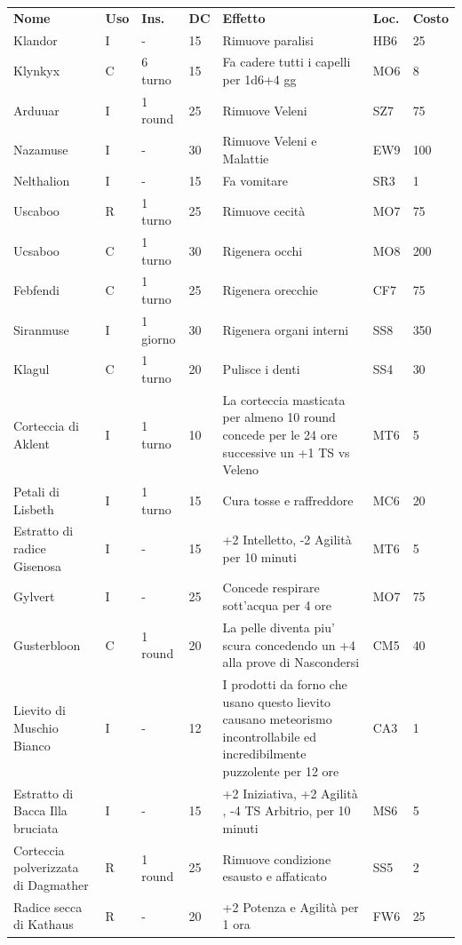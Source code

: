 \documentclass[a4paper,11pt,twoside,openany]{book}
\begin{document}
\begin{tabularx}{0.95\textwidth}{XlllXll}
\textbf{Nome}  & \textbf{Uso} & \textbf{Ins.} & \textbf{DC} & \textbf{Effetto}& \textbf{Loc.} & \textbf{Costo} \\
Klandor\index{Klandor}   & I  & -    & 15& Rimuove paralisi& HB6 & 25   \\
Klynkyx\index{Klynkyx}   & C  & 6 turno   & 15& Fa cadere tutti i capelli per 1d6+4 gg   & MO6 & 8    \\
Arduuar\index{Arduuar}   & I  & 1 round   & 25& Rimuove Veleni  & SZ7 & 75   \\
Nazamuse \index{Nazamuse}& I  & -    & 30& Rimuove Veleni e Malattie & EW9 & 100  \\
Nelthalion \index{Nelthalion} & I  & -    & 15& Fa vomitare& SR3 & 1    \\
Uscaboo \index{Uscaboo}  & R  & 1 turno   & 25& Rimuove cecità  & MO7 & 75   \\
Ucsaboo \index{Ucsaboo}  & C  & 1 turno   & 30& Rigenera occhi  & MO8 & 200  \\
Febfendi \index{Febfendi}& C  & 1 turno   & 25& Rigenera orecchie    & CF7 & 75   \\
Siranmuse\index{Siranmuse}    & I  & 1 giorno  & 30& Rigenera organi interni   & SS8 & 350  \\
Klagul\index{Klagul}& C  & 1 turno   & 20& Pulisce i denti & SS4 & 30   \\
Corteccia di Aklent\index{Corteccia di Aklent}    & I  & 1 turno   & 10& La corteccia masticata per almeno 10 round concede per le 24 ore successive un +1 TS vs Veleno  & MT6 & 5    \\
Petali di Lisbeth \index{Petali di Lisbeth}  & I  & 1 turno   & 15& Cura tosse e raffreddore  & MC6 & 20   \\
Estratto di radice Gisenosa\index{Estratto di radice Gisenosa}   & I  & -    & 15& +2 Intelletto, -2 Agilità per 10 minuti  & MT6 & 5    \\
Gylvert\index{Gylvert}   & I  & -    & 25& Concede respirare sott'acqua per 4 ore   & MO7 & 75 \\
Gusterbloon \index{Gusterbloon}    & C  & 1 round   & 20& La pelle diventa piu' scura concedendo un +4 alla prove di Nascondersi & CM5 & 40  \\
Lievito di Muschio Bianco \index{Lievito di Muschio Bianco} & I  & -    & 12& I prodotti da forno che usano questo lievito causano meteorismo incontrollabile ed incredibilmente puzzolente per 12 ore & CA3 & 1    \\
Estratto di Bacca Illa bruciata\index{Estratto di Bacca Illa bruciata}& I  & - & 15& +2 Iniziativa, +2 Agilità , -4 TS Arbitrio, per 10 minuti    & MS6 & 5    \\
Corteccia polverizzata di Dagmather\index{Polvere di corteccia di Dagmather}    & R  & 1 round   & 25& Rimuove condizione esausto e affaticato  & SS5 & 2    \\
Radice secca di Kathaus\index{Radice secca di Kathaus} & R  & -    & 20& +2 Potenza e Agilità per 1 ora & FW6 & 25   \\
\end{tabularx}
\end{document}
